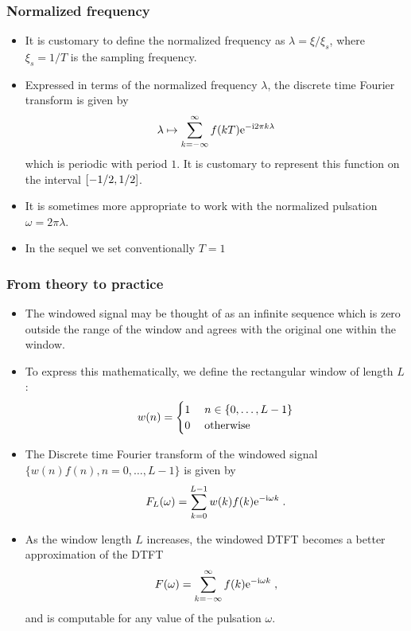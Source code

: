 \begin{frame}
\frametitle{Normalized frequency}
\begin{itemize}
\item It is customary to define the \alert{normalized} frequency as \alert{$ \lambda = \xi/ \xi_s$}, where \alert{$\xi_s= 1/T$} is the sampling frequency. 
\item Expressed in terms of the normalized frequency $\lambda$, the discrete time Fourier transform is given by
\[
\lambda \mapsto \sum_{k=-\infty}^{\infty} f(kT) \mathrm{e}^{- \mathrm{i} 2 \pi k \lambda}
\]
which is periodic with period $1$. It is customary to represent this function on the interval $\left[-1/2,1/2\right]$.
\item It is sometimes more appropriate to work with the \alert{normalized pulsation} \alert{$\omega= 2 \pi \lambda$}.
\item In the sequel we set conventionally $T=1$   
\end{itemize}
\end{frame}

\begin{frame}
\frametitle{From theory to practice}
\begin{itemize}
\item The windowed signal may be thought of as an \alert{infinite sequence} which is zero outside the range of the window and agrees with the original one within the window. 
\item To express this mathematically, we define the \alert{rectangular} window of length $L$:
\[
w(n) = 
\begin{cases}
1 \; & n \in \{0,\dots,L-1\} \\
0 &  \text{otherwise}
\end{cases}
\]
\item The Discrete time Fourier transform of the windowed signal $\{ w(n) f(n), n=0,\dots,L-1\}$ is given by
\[
F_L(\omega)= \sum_{k=0}^{L-1} w(k) f(k) \mathrm{e}^{-\mathrm{i} \omega k} \;.
\]
\item As the window length $L$ increases, the windowed DTFT becomes a better approximation of the DTFT
\[
F(\omega) = \sum_{k=-\infty}^{\infty} f(k) \mathrm{e}^{-\mathrm{i} \omega k} \;,
\]
and is computable for any value of the pulsation $\omega$.
\end{itemize}
\end{frame}

